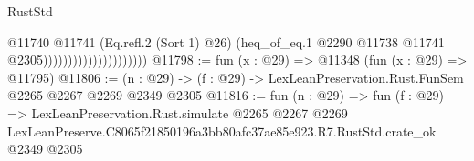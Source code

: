 \begin{lexlean}{RustStd}
\begin{coremodule}
                                          @11740
                                            @11741
                                            (Eq.refl.{2} (Sort 1) @26)
                                            (heq_of_eq.{1}
                                              @2290
                                              @11738
                                              @11741
                                              @2305)))))))))))))))))))))
@11798 := fun (x : @29) => @11348 (fun (x : @29) => @11795)
@11806 := (n : @29) -> (f : @29) -> LexLeanPreservation.Rust.FunSem @2265 @2267 @2269 @2349 @2305
@11816 := fun (n : @29) =>
  fun (f : @29) =>
  LexLeanPreservation.Rust.simulate
    @2265
    @2267
    @2269
    LexLeanPreserve.C8065f21850196a3bb80afc37ae85e923.R7.RustStd.crate_ok
    @2349
    @2305
\end{coremodule}
\end{lexlean}
